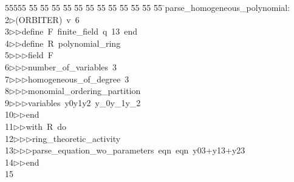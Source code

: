 %
%
\begin{tabbing}
55555 \= 55 \= 55 \= 55 \= 55 \= 55 \= 55 \= 55 \= 55 \= 55 \= 55 \= 55 \= 55 \= \>parse\_homogeneous\_polynomial:\\[0pt]
2\>$\triangleright$\>(ORBITER)\ v\ 6\ \\[0pt]
3\>$\triangleright$\>$\triangleright$\>define\ F\ finite\_field\ q\ 13\ end\ \\[0pt]
4\>$\triangleright$\>$\triangleright$\>define\ R\ polynomial\_ring\ \\[0pt]
5\>$\triangleright$\>$\triangleright$\>$\triangleright$\>field\ F\ \\[0pt]
6\>$\triangleright$\>$\triangleright$\>$\triangleright$\>number\_of\_variables\ 3\ \\[0pt]
7\>$\triangleright$\>$\triangleright$\>$\triangleright$\>homogeneous\_of\_degree\ 3\ \\[0pt]
8\>$\triangleright$\>$\triangleright$\>$\triangleright$\>monomial\_ordering\_partition\ \\[0pt]
9\>$\triangleright$\>$\triangleright$\>$\triangleright$\>variables\ y0y1y2\ y\_0y\_1y\_2\ \\[0pt]
10\>$\triangleright$\>$\triangleright$\>end\ \\[0pt]
11\>$\triangleright$\>$\triangleright$\>with\ R\ do\ \\[0pt]
12\>$\triangleright$\>$\triangleright$\>$\triangleright$\>ring\_theoretic\_activity\ \\[0pt]
13\>$\triangleright$\>$\triangleright$\>$\triangleright$\>parse\_equation\_wo\_parameters\ eqn\ eqn\ y03+y13+y23\ \\[0pt]
14\>$\triangleright$\>$\triangleright$\>end\\[0pt]
15\>\end{tabbing}
